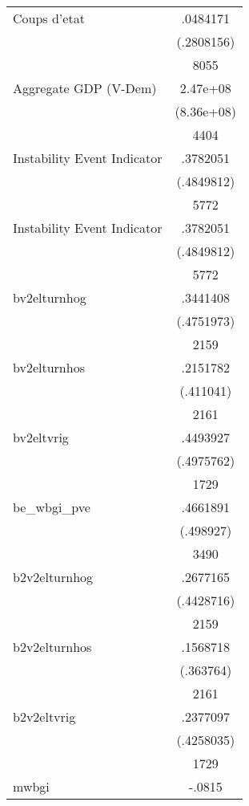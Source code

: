 {\begin{tabular}{l*{1}{c}}
Coups d'etat        &    .0484171\\
                    &  (.2808156)\\
                    &        8055\\
Aggregate GDP (V-Dem)&    2.47e+08\\
                    &  (8.36e+08)\\
                    &        4404\\
Instability Event Indicator&    .3782051\\
                    &  (.4849812)\\
                    &        5772\\
Instability Event Indicator&    .3782051\\
                    &  (.4849812)\\
                    &        5772\\
bv2elturnhog        &    .3441408\\
                    &  (.4751973)\\
                    &        2159\\
bv2elturnhos        &    .2151782\\
                    &   (.411041)\\
                    &        2161\\
bv2eltvrig          &    .4493927\\
                    &  (.4975762)\\
                    &        1729\\
be\_wbgi\_pve         &    .4661891\\
                    &   (.498927)\\
                    &        3490\\
b2v2elturnhog       &    .2677165\\
                    &  (.4428716)\\
                    &        2159\\
b2v2elturnhos       &    .1568718\\
                    &   (.363764)\\
                    &        2161\\
b2v2eltvrig         &    .2377097\\
                    &  (.4258035)\\
                    &        1729\\
mwbgi               &      -.0815\\

\end{tabular}}
